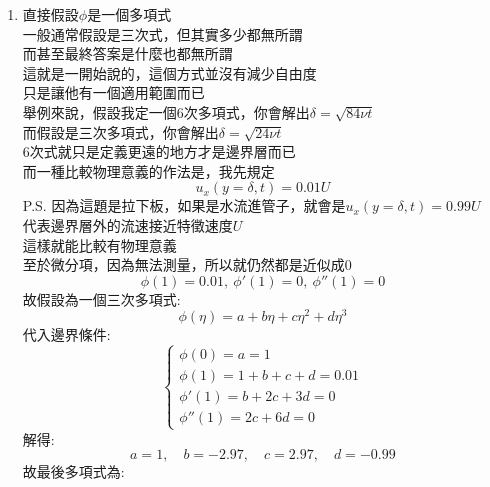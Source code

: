 \documentclass[../main.tex]{subfiles}
\begin{document}
\begin{itemize}
\begin{enumerate}
\begin{itemize}
\begin{enumerate}
        $\eta=1$時，$\phi=0$，雖然$\eta$這時代表的位置不知道在哪，但$\phi$就是0
      \item 直接假設$\phi$是一個多項式\\
        一般通常假設是三次式，但其實多少都無所謂\\
        而甚至最終答案是什麼也都無所謂\\
        這就是一開始說的，這個方式並沒有減少自由度\\
        只是讓他有一個適用範圍而已\\
        舉例來說，假設我定一個6次多項式，你會解出$\delta=\sqrt{84\nu t}$\\
        而假設是三次多項式，你會解出$\delta=\sqrt{24\nu t}$\\
        6次式就只是定義更遠的地方才是邊界層而已\\
        而一種比較物理意義的作法是，我先規定
        \begin{equation}
          u_x(y=\delta,t) = 0.01 U
        \end{equation}
        P.S. 因為這題是拉下板，如果是水流進管子，就會是$u_x(y=\delta,t) = 0.99 U$\\
        代表邊界層外的流速接近特徵速度$U$\\
        這樣就能比較有物理意義\\
        至於微分項，因為無法測量，所以就仍然都是近似成0
        \begin{equation}
          \phi(1) = 0.01,~\phi'(1) = 0,~\phi''(1) = 0
        \end{equation}
        故假設為一個三次多項式:
        \begin{equation}
          \phi(\eta) = a + b\eta + c\eta^2 + d\eta^3
        \end{equation}
        代入邊界條件:
        \begin{equation}
          \begin{cases}
            \phi(0) = a = 1\\
            \phi(1) = 1 + b + c + d = 0.01 \\
            \phi'(1) = b + 2c + 3d = 0\\
            \phi''(1) = 2c + 6d = 0
          \end{cases}
        \end{equation}
        解得:
        \begin{equation}
          a= 1,\quad b=-2.97, \quad c=2.97, \quad d=-0.99
        \end{equation}
        故最後多項式為:
        \begin{equation}

\end{equation}
\end{enumerate}
\end{itemize}
\end{enumerate}
\end{itemize}
\end{document}
